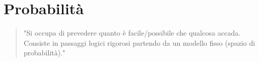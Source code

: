 \section{Probabilità}

\begin{quotation}
	"Si occupa di prevedere quanto è facile/possibile che qualcosa accada. Consiste in passaggi logici rigorosi partendo da un modello fisso (spazio di probabilità)."
\end{quotation}